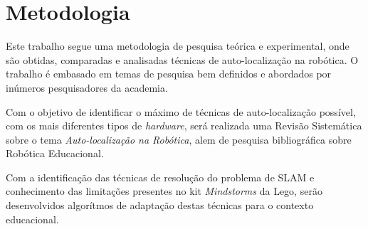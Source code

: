 \chapter[Metodologia]{Metodologia}

Este trabalho segue uma metodologia de pesquisa teórica e experimental, onde são obtidas, comparadas e analisadas técnicas de auto-localização na robótica. O trabalho é embasado em temas de pesquisa bem definidos e abordados por inúmeros pesquisadores da academia.

Com o objetivo de identificar o máximo de técnicas de auto-localização possível, com os mais diferentes tipos de \textit{hardware}, será realizada uma Revisão Sistemática sobre o tema \textit{Auto-localização na Robótica}, alem de pesquisa bibliográfica sobre Robótica Educacional.

Com a identificação das técnicas de resolução do problema de SLAM e conhecimento das limitações presentes no kit \textit{Mindstorms} da Lego, serão desenvolvidos algorítmos de adaptação destas técnicas para o contexto educacional. 